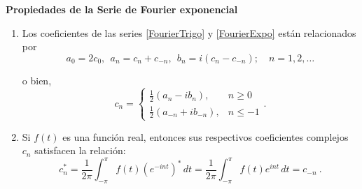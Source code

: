 \begin{propiedad} 
    \textbf{Propiedades de la Serie de Fourier exponencial}
    \begin{enumerate}
        \item Los coeficientes de las series \eqref{FourierTrigo} y \eqref{FourierExpo} están relacionados por 
        \begin{equation}
        a_0 = 2c_0,~~ a_n = c_n + c_{-n}, ~~ b_n = i(c_n - c_{-n}); \quad n = 1,2, \dots    \label{RelacionCoefi1}
        \end{equation}
        
        o bien, 
        \begin{equation}
            c_n = \left\{ \begin{array}{cl}
                \frac{1}{2} (a_n - ib_n), & n \geq 0  \\
            \frac{1}{2}(a_{-n} + i b_{-n}),     & n  \leq -1 
            \end{array} \right. . \label{RelacionCoefi2}
        \end{equation}

        \item Si $f(t)$ es una función real, entonces sus respectivos coeficientes complejos $c_n$ satisfacen la relación:
        $$c_n^* = \frac{1}{2\pi} \int_{-\pi}^{\pi} f(t) (e^{-int})^* \,dt = \frac{1}{2\pi} \int_{-\pi}^{\pi} f(t) e^{int} \,dt = c_{-n}\ .$$
    \end{enumerate}
\end{propiedad}









